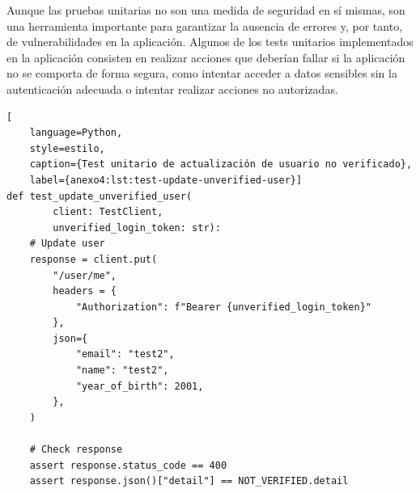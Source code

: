 Aunque las pruebas unitarias no son una medida de seguridad en sí mismas, son una herramienta
importante para garantizar la ausencia de errores y, por tanto, de vulnerabilidades en la
aplicación. Algunos de los tests unitarios implementados en la aplicación consisten en realizar
acciones que deberían fallar si la aplicación no se comporta de forma segura, como intentar
acceder a datos sensibles sin la autenticación adecuada o intentar realizar acciones no autorizadas.

\begin{lstlisting}[
    language=Python,
    style=estilo,
    caption={Test unitario de actualización de usuario no verificado},
    label={anexo4:lst:test-update-unverified-user}]
def test_update_unverified_user(
        client: TestClient,
        unverified_login_token: str):
    # Update user
    response = client.put(
        "/user/me",
        headers = {
            "Authorization": f"Bearer {unverified_login_token}"
        },
        json={
            "email": "test2",
            "name": "test2",
            "year_of_birth": 2001,
        },
    )

    # Check response
    assert response.status_code == 400
    assert response.json()["detail"] == NOT_VERIFIED.detail
\end{lstlisting}

